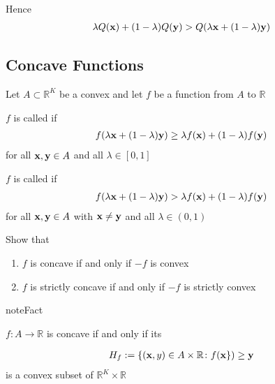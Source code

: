 \documentclass[letterpaper,10pt,english]{jupyterBook}
\begin{document}
\sphinxAtStartPar
Hence
\begin{equation*}
\begin{split}
%
\lambda Q({\bf x}) + (1 - \lambda) Q({\bf y})
> Q(\lambda {\bf x} + (1 - \lambda) {\bf y})
%
\end{split}
\end{equation*}

\subsection{Concave Functions}
\label{\detokenize{06.optimization_fundamentals:concave-functions}}
\sphinxAtStartPar
Let \(A \subset \mathbb{R}^K\) be a convex and let \(f\) be a function from \(A\) to \(\mathbb{R}\)

\sphinxAtStartPar
\(f\) is called  if
\begin{equation*}
\begin{split}
%
f(\lambda {\bf x} + (1 - \lambda) {\bf y})
\geq \lambda f({\bf x}) + (1 - \lambda) f({\bf y})
%
\end{split}
\end{equation*}
\sphinxAtStartPar
for all \({\bf x}, {\bf y} \in A\) and all \(\lambda \in [0, 1]\)

\sphinxAtStartPar
\(f\) is called  if
\begin{equation*}
\begin{split}
%
f(\lambda {\bf x} + (1 - \lambda) {\bf y})
> \lambda f({\bf x}) + (1 - \lambda) f({\bf y})
%
\end{split}
\end{equation*}
\sphinxAtStartPar
for all \({\bf x}, {\bf y} \in A\) with \({\bf x} \ne {\bf y}\) and all \(\lambda \in (0, 1)\)

\sphinxAtStartPar
{} Show that
\begin{enumerate}
%
\item {} 
\sphinxAtStartPar
\(f\) is concave if and only if \(-f\) is convex

\item {} 
\sphinxAtStartPar
\(f\) is strictly concave if and only if \(-f\) is strictly convex

\end{enumerate}

\begin{sphinxadmonition}{note}{Fact}

\sphinxAtStartPar
\(f \colon A \to \mathbb{R}\) is concave if and only if its 
\end{sphinxadmonition}
\begin{equation*}
\begin{split}
%
H_f := \{ ({\bf x}, y) \in A \times \mathbb{R} \colon f({\bf x \}) \geq y}
%
\end{split}
\end{equation*}
\sphinxAtStartPar
is a convex subset of \(\mathbb{R}^K \times \mathbb{R}\)
\end{document}
